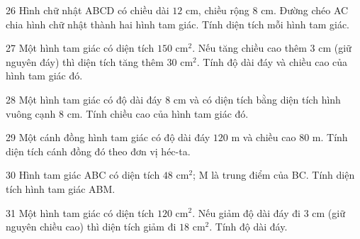 \gap
\begin{probbox}{26}{\relax}
Hình chữ nhật ABCD có chiều dài $12$ cm, chiều rộng $8$ cm. Đường chéo AC chia hình chữ nhật thành hai hình tam giác. Tính diện tích mỗi hình tam giác.
\end{probbox}
\gap
\begin{probbox}{27}{\relax}
Một hình tam giác có diện tích $150$ cm$^2$. Nếu tăng chiều cao thêm $3$ cm (giữ nguyên đáy) thì diện tích tăng thêm $30$ cm$^2$. Tính độ dài đáy và chiều cao của hình tam giác đó.
\end{probbox}
\gap
\begin{probbox}{28}{\relax}
Một hình tam giác có độ dài đáy $8$ cm và có diện tích bằng diện tích hình vuông cạnh $8$ cm. Tính chiều cao của hình tam giác đó.
\end{probbox}
\gap
\begin{probbox}{29}{\relax}
Một cánh đồng hình tam giác có độ dài đáy $120$ m và chiều cao $80$ m. Tính diện tích cánh đồng đó theo đơn vị héc-ta.
\end{probbox}
\gap
\begin{probbox}{30}{\relax}
Hình tam giác ABC có diện tích $48$ cm$^2$; M là trung điểm của BC. Tính diện tích hình tam giác ABM.
\end{probbox}
\begin{probbox}{31}{}
Một hình tam giác có diện tích $120$ cm$^2$. Nếu giảm độ dài đáy đi $3$ cm (giữ nguyên chiều cao) thì diện tích giảm đi $18$ cm$^2$. Tính độ dài đáy.
\end{probbox}
